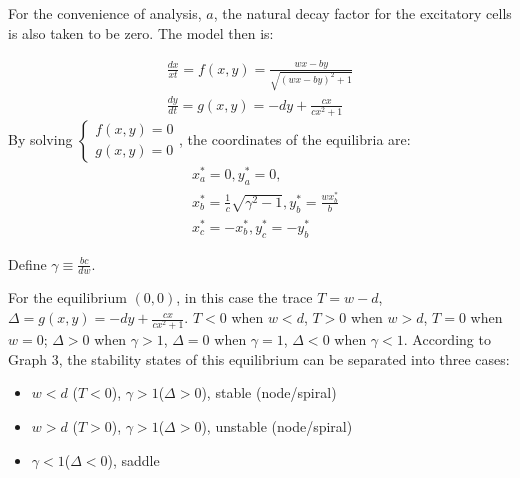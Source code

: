 \documentclass[12pt]{article}
\begin{document}
For the convenience of analysis, $a$, the natural decay factor for the excitatory cells is also taken to be zero. The model then is:

\begin{equation}
  \begin{matrix}
  \frac{dx}{xt}=f(x,y)=\frac{wx-by}{\sqrt{(wx-by)^2+1}}\\
  \frac{dy}{dt}=g(x,y)=-dy+\frac{cx}{cx^2+1}
  \end{matrix}
\end{equation}
\indent By solving $\left\{\begin{matrix} f(x,y)=0
\\g(x,y)=0\end{matrix}\right.$, the coordinates of the equilibria  are:
\begin{align*} 
  &x_a^*=0,y_a^*=0,\\
  &x_b^*=\frac{1}{c}\sqrt{\gamma^2-1},y_b^*=\frac{wx_b^*}{b}\\
  &x_c^*=-x_b^*,y_c^*=-y_b^*
  \end{align*}

\indent Define $\gamma\equiv \frac{bc}{dw}$. 

\indent For the equilibrium $(0,0)$, in this case the trace $T=w-d$, $\Delta=g(x,y)=-dy+\frac{cx}{cx^2+1}$. $T<0$ when $w<d$, $T>0$ when $w>d$, $T=0$ when $w=0$; $\Delta>0$ when $\gamma>1$, $\Delta=0$ when $\gamma=1$, $\Delta<0$ when $\gamma<1$. According to Graph 3, the stability states of this equilibrium can be separated into three cases: 
\begin{itemize}
  \item $w<d$ ($T<0$), $\gamma>1$($\Delta>0$), stable (node/spiral)
  \item $w>d$ ($T>0$), $\gamma>1$($\Delta>0$), unstable (node/spiral)
  \item $\gamma<1$($\Delta<0$), saddle
\end{itemize}
\end{document}
